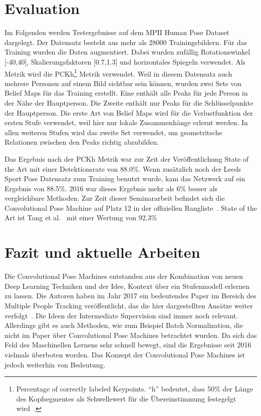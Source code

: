 \documentclass[journal, a4paper]{IEEEtran}
\begin{document}
\section{Evaluation}

        Im Folgenden werden Testergebnisse auf dem MPII Human Pose Dataset~\cite{MPII} dargelegt. Der Datensatz besteht aus mehr als 28000 Trainingsbildern. Für das Training wurden die Daten augmentiert. Dabei wurden zufällig Rotationswinkel [-40\degree,40\degree], Skalierungsfaktoren [0.7,1.3] und horizontales Spiegeln verwendet. Als Metrik wird die PCKh\footnote{Percentage of correctly labeled Keypoints. "`h"' bedeutet, dass 50\% der Länge des Kopfsegmentes als Schwellewert für die Übereinstimmung festegelgt wird~\cite{MPII}.} Metrik verwendet. 
        Weil in diesem Datensatz auch mehrere Personen auf einem Bild sichtbar sein können, wurden zwei Sets von Belief Maps für das Training erstellt. Eine enthält alle Peaks für jede Person in der Nähe der Hauptperson. Die Zweite enthält nur Peaks für die Schlüsselpunkte der Hauptperson.
        Die erste Art von Belief Maps wird für die Verlustfunktion der ersten Stufe verwendet, weil hier nur lokale Zusammenhänge erlernt werden. In allen weiteren Stufen wird das zweite Set verwendet, um geometritsche Relationen zwischen den Peaks richtig abzubilden.

        Das Ergebnis nach der PCKh Metrik war zur Zeit der Veröffentlichung State of the Art mit einer Detektionsrate von 88.0\%. Wenn zusätzlich noch der Leeds Sport Pose Datensatz zum Training benutzt wurde, kam das Netzwerk auf ein Ergebnis von 88.5\%. 2016 war dieses Ergebnis mehr als 6\% besser als vergleichbare Methoden. Zur Zeit dieser Seminararbeit befindet sich die Convolutional Pose Machine auf Platz 12 in der offiziellen Rangliste~\cite{MPII}. State of the Art ist Tang et al.~\cite{tang2018deeply} mit einer Wertung von 92.3\%
        
\section{Fazit und aktuelle Arbeiten}
        Die Convolutional Pose Machines entstanden aus der Kombination von neuen Deep Learning Techniken und der Idee, Kontext über ein Stufenmodell erlernen zu lassen. Die Autoren haben im Jahr 2017 ein bedeutendes Paper im Bereich des Multiple People Tracking veröffentlicht, das die hier dargestellten Ansätze weiter verfolgt~\cite{cao2017realtime}. Die Ideen der Intermediate Supervision sind immer noch relevant. Allerdings gibt es auch Methoden, wie zum Beispiel Batch Normalization, die nicht im Paper über Convolutional Pose Machines betrachtet wurden. Da sich das Feld des Maschinellen Lernens sehr schnell bewegt, sind die Ergebnisse seit 2016 vielmals überboten worden. Das Konzept der Convolutional Pose Machines ist jedoch weiterhin von Bedeutung.



\renewcommand\bibname{Literatur}

\end{document}
